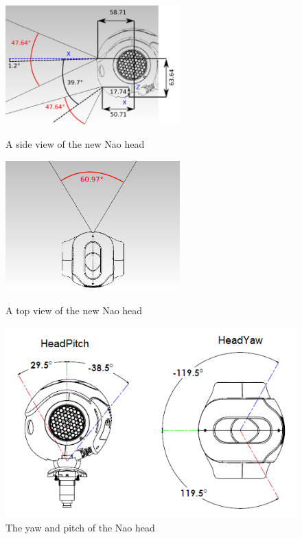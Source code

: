 \documentclass{report}
\begin{document}
 \begin{figure}[ht!]
\begin{minipage}[b]{0.5\linewidth}
  \centering
    \includegraphics[width=0.6\textwidth]{../Drawings/naoHead/naoHead.jpg}
    \caption{A side view of the new Nao head \cite{NaoHead}} 
    \label{fig:nao1}
\end{minipage}
\begin{minipage}[b]{0.5\linewidth}
  \centering
    \includegraphics[width=0.6\textwidth]{../Drawings/naoHead/naoHead1.jpg}
    \caption{A top view of the new Nao head \cite{NaoHead}} 
    \label{fig:nao2}
\end{minipage}
\begin{minipage}[b]{0.5\linewidth}
  \centering
    \includegraphics[width=1.0\textwidth]{../Drawings/naoHead/headyawpitch.png}
    \caption{The yaw and pitch of the Nao head \cite{NaoHead}} 
    \label{fig:yawPitch}
\end{minipage}
\end{figure}
\end{document}
